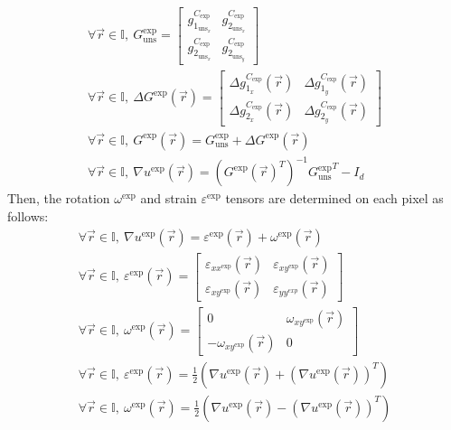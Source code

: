 \documentclass[12pt, titlepage]{article}
\begin{document}
\begin{equation}
\begin{gathered}
\forall \vec{r} \in \mathbb{I}, \ G_{\text{uns}}^{\text{exp}} =
	\begin{bmatrix}
	g_{1_{{\text{uns}}_x}}^{C_{\text{exp}}} & g_{2_{{\text{uns}}_x}}^{C_{\text{exp}}} \\
	g_{2_{{\text{uns}}_x}}^{C_{\text{exp}}} & g_{2_{{\text{uns}}_y}}^{C_{\text{exp}}} 
	\end{bmatrix} \\
\forall \vec{r} \in \mathbb{I}, \	\Delta G^{\text{exp}}(\vec{r})=
	\begin{bmatrix}
	\Delta g_{1_{x}}^{C_{\text{exp}}}(\vec{r}) & \Delta g_{1_{y}}^{C_{\text{exp}}}(\vec{r}) \\
	\Delta g_{2_{x}}^{C_{\text{exp}}}(\vec{r}) & \Delta g_{2_{y}}^{C_{\text{exp}}}(\vec{r})
	\end{bmatrix} \\
	\forall \vec{r} \in \mathbb{I}, \	G^{\text{exp}}(\vec{r})= G_{\text{uns}}^{\text{exp}} + \Delta G^{\text{exp}}(\vec{r})\\
\forall \vec{r} \in \mathbb{I}, \	\nabla u^{\text{exp}}(\vec{r}) = ({{G^{\text{exp}}}(\vec{r})}^{T})^{-1}{{G_{\text{uns}}^{\text{exp}}}}^{T}-I_{d}
\end{gathered}
\end{equation}
Then, the rotation $\omega^{\text{exp}}$ and strain $\varepsilon^{\text{exp}}$ tensors are determined on each pixel as follows:
\begin{equation}
\begin{gathered}
\forall \vec{r} \in \mathbb{I}, \ \nabla u^{\text{exp}}(\vec{r}) = \varepsilon^{\text{exp}}(\vec{r}) + \omega^{\text{exp}}(\vec{r}) \\
\forall \vec{r} \in \mathbb{I}, \ \varepsilon^{\text{exp}}(\vec{r}) = \begin{bmatrix}
	\varepsilon_{\mathit{xx}^{\text{exp}}}(\vec{r}) & \varepsilon_{\mathit{xy}^{\text{exp}}}(\vec{r}) \\
	\varepsilon_{\mathit{xy}^{\text{exp}}}(\vec{r}) & \varepsilon_{\mathit{yy^{\text{exp}}}}(\vec{r})
	\end{bmatrix} \\
\forall \vec{r} \in \mathbb{I}, \ \omega^{\text{exp}}(\vec{r}) = \begin{bmatrix}
	0 & \omega_{\mathit{xy}^{\text{exp}}}(\vec{r}) \\
	-\omega_{\mathit{xy}^{\text{exp}}}(\vec{r}) & 0 
	\end{bmatrix} \\ 
\forall \vec{r} \in \mathbb{I}, \ \varepsilon^{\text{exp}}(\vec{r}) = \frac{1}{2}(\nabla u^{\text{exp}}(\vec{r})+(\nabla u^{\text{exp}}(\vec{r}))^{T}) \\
\forall \vec{r} \in \mathbb{I}, \ \omega^{\text{exp}}(\vec{r}) = \frac{1}{2}(\nabla u^{\text{exp}}(\vec{r})-(\nabla u^{\text{exp}}(\vec{r}))^{T})
\end{gathered}
\end{equation}
\end{document}
